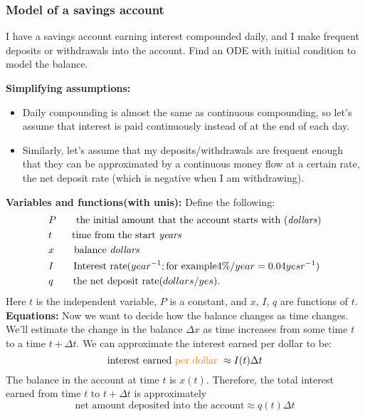 \subsubsection{Model of a savings account}
\begin{example}
  I have a savings account earning interest compounded daily,
  and I make frequent deposits or withdrawals into the account.
  Find an ODE with initial condition to model the balance.
\end{example}
\textbf{\color{blue} Simplifying assumptions:}
\begin{itemize}
\item Daily compounding is almost the same as continuous compounding, so let's assume that interest is paid continuously instead of at the end of each day.
\item Similarly, let's assume that my deposits/withdrawals are frequent enough that they can be approximated by a continuous money flow at a certain rate, the {\color{blue}net deposit rate}
  (which is negative when I am withdrawing).
\end{itemize}
\textbf{\color{blue} Variables and functions(with unis): } Define the following:
\begin{align*}
  &P \qquad \text{the initial amount that the account starts with (\textit{dollars})} \\ 
  &t \qquad \text{time from the start \textit{years}} \\
  &x \qquad \text{balance \textit{dollars}} \\
  &I \qquad \text{Interest rate}  (year^{-1}; \text{for example} 4\%/year = 0.04yesr^{-1}) \\
  &q \qquad \text{the net deposit rate} (dollars/yes).
\end{align*}
Here $t$ is the independent variable, $P$ is a constant, and $x$, $I$, $q$ are functions of $t$. \\
\textbf{\color{blue} Equations:} Now we want to decide how the balance changes as time changes.
We'll estimate the change in the balance $\Delta x$ as time increases from some time $t$
to a time $t+ \Delta t$. We can approximate the interest earned per dollar to be:
\begin{equation*}
  \displaystyle \text{interest earned {\color{orange}per dollar }}  \approx I(t) \Delta t 
\end{equation*}
The balance in the account at time $t$ is $x(t)$.
Therefore, the total interest earned from time $t$ to $t + \Delta t$  is approximately
\begin{equation*}
  \displaystyle \text{net amount deposited into the account} \approx q(t) \Delta t 
\end{equation*}
